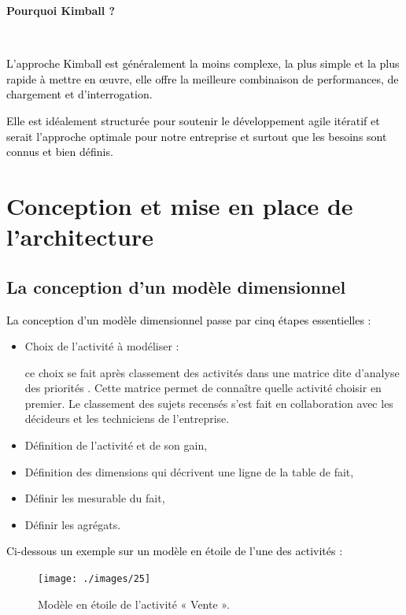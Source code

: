 \documentclass[a4paper,12pt]{report}
\begin{document}
\textbf{Pourquoi Kimball ?}

~\

\textcolor{black}{L'approche Kimball est généralement la moins complexe, la plus simple et la plus rapide à mettre en œuvre, elle offre la meilleure combinaison de performances, de chargement et d'interrogation.}

\textcolor{black}{Elle est idéalement structurée pour soutenir le développement agile itératif et serait l'approche optimale pour notre entreprise et surtout que les besoins sont connus et bien définis.}



\section{Conception et mise en place de l’architecture }
\subsection{La conception d’un modèle dimensionnel  }
\textcolor{black}{La conception d’un modèle dimensionnel passe par cinq étapes essentielles :}

\begin{itemize}

	\item  \begin{bf}Choix de l’activité à modéliser : \end{bf} ce choix se fait après classement des activités dans une matrice dite d’analyse des priorités \citep{kimball2004data}. Cette matrice permet de connaître quelle activité choisir en premier. Le classement des sujets recensés s’est fait en collaboration avec les décideurs et les techniciens de l’entreprise.
	\item  Définition de l’activité et de son gain,
	\item  Définition des dimensions qui décrivent une ligne de la table de fait,
	\item  Définir les mesurable du fait,
	\item  Définir les agrégats.
\end{itemize}

\textcolor{black}{Ci-dessous un exemple sur un modèle en étoile de l’une des activités :}

\begin{figure}[H]

\begin{center}
\texttt{[image: ./images/25]}
\end{center}

\caption{Modèle en étoile de l’activité « Vente ».}
\label{fig:1}

\end{figure}
\end{document}

